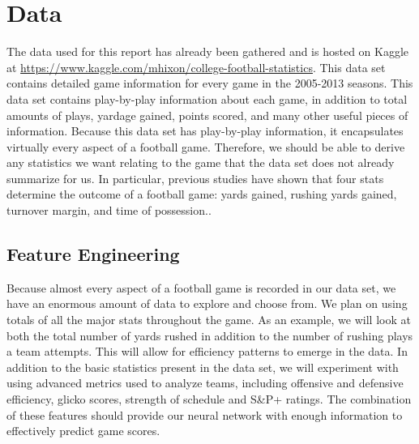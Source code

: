 \documentclass[10pt,twocolumn,letterpaper]{article}
\begin{document}
\section{Data}
The data used for this report has already been gathered and is hosted on Kaggle at \url{https://www.kaggle.com/mhixon/college-football-statistics}.  This data set contains detailed game information for every game in the 2005-2013 seasons. This data set contains play-by-play information about each game, in addition to total amounts of plays, yardage gained, points scored, and many other useful pieces of information. Because this data set has play-by-play information, it encapsulates virtually every aspect of a football game. Therefore, we should be able to derive any statistics we want relating to the game that the data set does not already summarize for us. In particular, previous studies have shown that four stats determine the outcome of a football game: yards gained, rushing yards gained, turnover margin, and time of possession.\cite{purucker1996neural}. 
\subsection{Feature Engineering}
Because almost every aspect of a football game is recorded in our data set, we have an enormous amount of data to explore and choose from. We plan on using totals of all the major stats throughout the game. As an example, we will look at both the total number of yards rushed in addition to the number of rushing plays a team attempts. This will allow for efficiency patterns to emerge in the data. In addition to the basic statistics present in the data set, we will experiment with using advanced metrics used to analyze teams, including offensive and defensive efficiency, glicko scores, strength of schedule and S\&P+ ratings. The combination of these features should provide our neural network with enough information to effectively predict game scores.




\end{document}
